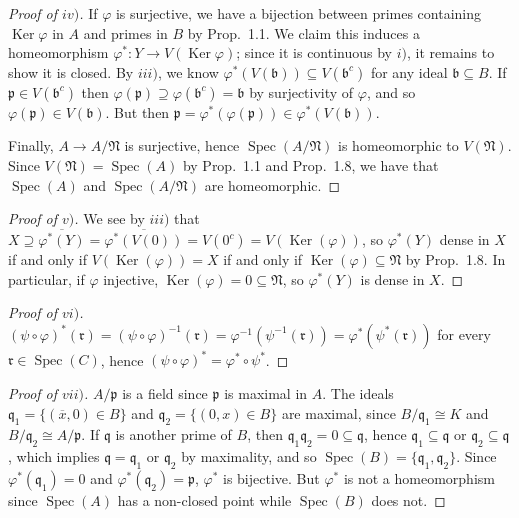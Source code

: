 \documentclass[12pt,letterpaper]{article}
\theoremstyle{definition}
\theoremstyle{remark}
\numberwithin{figure}{problem}
\numberwithin{equation}{section}
\DeclareMathOperator{\Spec}{Spec}
\DeclareMathOperator{\Ker}{Ker}
\begin{document}
\begin{proof}[Proof of
  $iv)$]
  If
  $\varphi$ is surjective, we have a bijection between primes containing
  $\Ker\varphi$ in
  $A$ and primes in
  $B$ by Prop.~1.1.
  We claim this induces a homeomorphism
  $\varphi^*\colon Y \to
  V(\Ker\varphi)$; since it is continuous by
  $i)$, it remains to show it is closed.
  By
  $iii)$, we know
  $\varphi^*(V(\mathfrak{b})) \subseteq
  V(\mathfrak{b}^c)$ for any ideal
  $\mathfrak{b} \subseteq
  B$.
  If
  $\mathfrak{p} \in
  V(\mathfrak{b}^c)$ then
  $\varphi(\mathfrak{p}) \supseteq \varphi(\mathfrak{b}^c) =
  \mathfrak{b}$ by surjectivity of
  $\varphi$, and so
  $\varphi(\mathfrak{p}) \in
  V(\mathfrak{b})$.
  But then
  $\mathfrak{p} = \varphi^*(\varphi(\mathfrak{p})) \in
  \varphi^*(V(\mathfrak{b}))$.
  \par Finally,
  $A \to
  A/\mathfrak{N}$ is surjective, hence
  $\Spec(A/\mathfrak{N})$ is homeomorphic to
  $V(\mathfrak{N})$.
  Since
  $V(\mathfrak{N})=\Spec(A)$ by Prop.~1.1 and Prop.~1.8, we have that
  $\Spec(A)$ and
  $\Spec(A/\mathfrak{N})$ are homeomorphic.
\end{proof}
\begin{proof}[Proof of
  $v)$]
  We see by
  $iii)$ that
  $X \supseteq \overline{\varphi^*(Y)} = \overline{\varphi^*(V(0))} = V(0^c) =
  V(\Ker(\varphi))$, so
  $\varphi^*(Y)$ dense in
  $X$ if and only if
  $V(\Ker(\varphi)) =
  X$ if and only if
  $\Ker(\varphi) \subseteq
  \mathfrak{N}$ by Prop.~1.8.
  In particular, if
  $\varphi$ injective,
  $\Ker(\varphi) = 0 \subseteq
  \mathfrak{N}$, so
  $\varphi^*(Y)$ is dense in
  $X$.
\end{proof}
\begin{proof}[Proof of
  $vi)$]
  $(\psi \circ \varphi)^*(\mathfrak{r}) = (\psi \circ \varphi)^{-1}(\mathfrak{r}) = \varphi^{-1}(\psi^{-1}(\mathfrak{r})) =
  \varphi^*(\psi^*(\mathfrak{r}))$ for every
  $\mathfrak{r} \in
  \Spec(C)$, hence
  $(\psi \circ \varphi)^* = \varphi^* \circ
  \psi^*$.
\end{proof}
\begin{proof}[Proof of
  $vii)$]
  $A/\mathfrak{p}$ is a field since
  $\mathfrak{p}$ is maximal in
  $A$.
  The ideals
  $\mathfrak{q}_1 = \{(\overline{x},0) \in
    B\}$ and
  $\mathfrak{q}_2 = \{(0,x) \in
    B\}$ are maximal, since
  $B/\mathfrak{q}_1 \cong
  K$ and
  $B/\mathfrak{q}_2 \cong
  A/\mathfrak{p}$.
  If
  $\mathfrak{q}$ is another prime of
  $B$, then
  $\mathfrak{q}_1\mathfrak{q}_2 = 0 \subseteq
  \mathfrak{q}$, hence
  $\mathfrak{q}_1 \subseteq
  \mathfrak{q}$ or
  $\mathfrak{q}_2 \subseteq
  \mathfrak{q}$, which implies
  $\mathfrak{q} =
  \mathfrak{q}_1$ or
  $\mathfrak{q}_2$ by maximality, and so
  $\Spec(B) =
  \{\mathfrak{q}_1,\mathfrak{q}_2\}$.
  Since
  $\varphi^*(\mathfrak{q}_1) =
  0$ and
  $\varphi^*(\mathfrak{q}_2) =
  \mathfrak{p}$,
  $\varphi^*$ is bijective.
  But
  $\varphi^*$ is not a homeomorphism since
  $\Spec(A)$ has a non-closed point while
  $\Spec(B)$ does not.
\end{proof}
\end{document}
